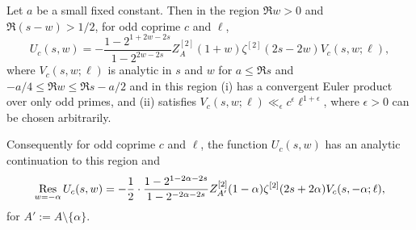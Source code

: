 \documentclass[10pt,a4paper]{amsart}
\begin{document}
	\begin{lemma}
		\label{lemma:singularity location}
		Let $a$ be a small fixed constant. Then in the region $\Re w > 0$ and $\Re(s-w) > 1/2$, for odd coprime $c$ and $\ell$,
		\begin{equation}
			\label{eq:Uc(s,w) continuation}
			U_c(s,w) = -\frac{1-2^{1+2w-2s}}{1-2^{2w-2s}} Z^{[2]}_A(1+w) \zeta^{[2]}(2s-2w) V_c(s,w;\ell),
		\end{equation}
		where $V_c(s,w;\ell)$ is analytic in $s$ and $w$ for $a \leq \Re s$ and $-a/4 \leq \Re w \leq \Re s -a/2$ and in this region (i) has a convergent Euler product over only odd primes, and (ii) satisfies $V_c(s,w;\ell) \ll_\epsilon c^\epsilon \ell^{1+\epsilon}$, where $\epsilon > 0$ can be chosen arbitrarily.
		
		Consequently for odd coprime $c$ and $\ell$, the function $U_c(s,w)$ has an analytic continuation to this region and
		\begin{equation}
			\label{eq:ResUc(s,w) continuation}
			\operatornamewithlimits{Res}_{w = -\alpha} U_c(s,w) = -\frac{1}{2} \cdot \frac{1-2^{1-2\alpha-2s}}{1-2^{-2\alpha-2s}} Z^{[2]}_{A'}(1-\alpha) \zeta^{[2]}(2s+2\alpha) V_c(s,-\alpha;\ell),
		\end{equation}
		for $A':= A \setminus \{\alpha\}$.
	\end{lemma}
\end{document}
